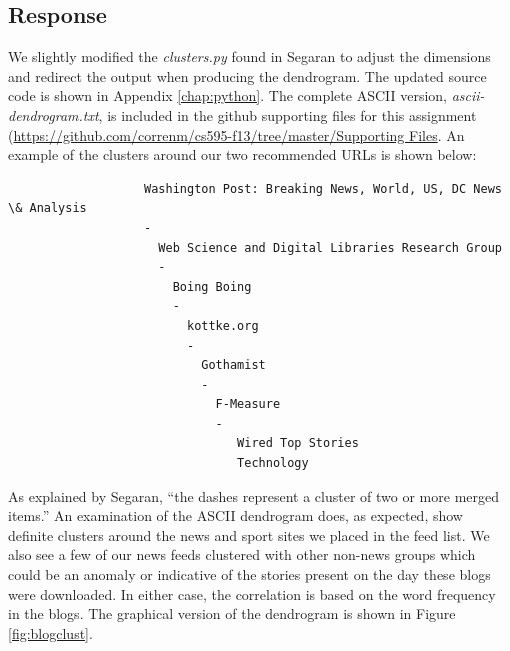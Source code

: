 \documentclass[letterpaper,11pt]{report}
\begin{document}
\begin{savenotes}
\subsection{Response}We slightly modified the \emph{clusters.py} found in Segaran \cite{segaran2007programming} to adjust the dimensions and redirect the output when producing the dendrogram. The updated source code is shown in Appendix \ref{chap:python}. The complete ASCII version, \emph{ascii-dendrogram.txt}, is included in the github supporting files for this assignment (\url{https://github.com/correnm/cs595-f13/tree/master/Supporting Files}. An example of the clusters around our two recommended URLs is shown below:

\begin{verbatim}
                   Washington Post: Breaking News, World, US, DC News \& Analysis
                   -
                     Web Science and Digital Libraries Research Group
                     -
                       Boing Boing
                       -
                         kottke.org
                         -
                           Gothamist
                           -
                             F-Measure
                             -
                                Wired Top Stories
                                Technology
\end{verbatim}
																									
As explained by Segaran, ``the dashes represent a cluster of two or more  merged  items.'' An examination of the ASCII dendrogram does, as expected, show definite clusters around the news and sport sites we placed in the feed list.  We also see a few of our news feeds clustered with other non-news groups which could be an anomaly or indicative of the stories present on the day these blogs were downloaded. In either case, the correlation is based on the word frequency in the blogs. The graphical version of the dendrogram is shown in Figure \ref{fig:blogclust}.


\end{savenotes}
\end{document}
